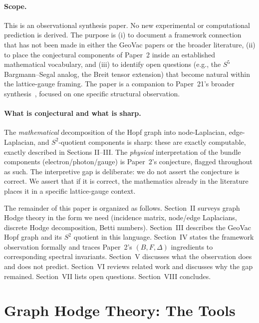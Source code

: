 \documentclass[aps,pra,twocolumn,superscriptaddress,longbibliography]{revtex4-2}
\begin{document}
\paragraph*{Scope.} This is an observational synthesis paper.  No new
experimental or computational prediction is derived.  The purpose is
(i) to document a framework connection that has not been made in
either the GeoVac papers or the broader literature, (ii) to place the
conjectural components of Paper~2 inside an established mathematical
vocabulary, and (iii) to identify open questions (e.g., the $S^5$
Bargmann--Segal analog, the Breit tensor extension) that become
natural within the lattice-gauge framing.  The paper is a
companion to Paper~21's broader synthesis~\cite{Paper21}, focused on
one specific structural observation.

\paragraph*{What is conjectural and what is sharp.} The
\emph{mathematical} decomposition of the Hopf graph into
node-Laplacian, edge-Laplacian, and $S^2$-quotient components is
sharp: these are exactly computable, exactly described in Sections
II--III.  The \emph{physical} interpretation of the bundle components
(electron/photon/gauge) is Paper~2's conjecture, flagged throughout
as such.  The interpretive gap is deliberate: we do not assert the
conjecture is correct.  We assert that if it is correct, the
mathematics already in the literature places it in a specific
lattice-gauge context.

The remainder of this paper is organized as follows.  Section~II
surveys graph Hodge theory in the form we need (incidence matrix,
node/edge Laplacians, discrete Hodge decomposition, Betti numbers).
Section~III describes the GeoVac Hopf graph and its $S^2$ quotient in
this language.  Section~IV states the framework observation formally
and traces Paper~2's $(B, F, \Delta)$ ingredients to corresponding
spectral invariants.  Section~V discusses what the observation does
and does not predict.  Section~VI reviews related work and discusses
why the gap remained.  Section~VII lists open questions.  Section~VIII
concludes.


\section{Graph Hodge Theory: The Tools}
\label{sec:hodge}
\end{document}
